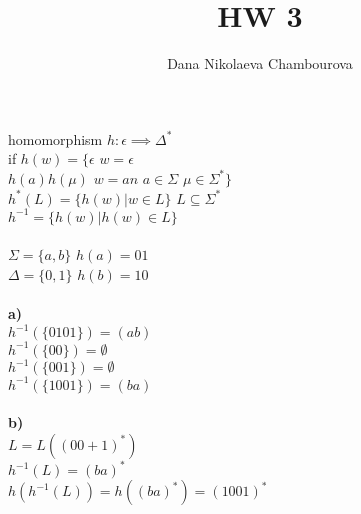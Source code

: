 \documentclass[12pt]{article}
\newenvironment{problem}[2][Problem]{\begin{trivlist}
\item[\hskip \labelsep {\bfseries #1}\hskip \labelsep {\bfseries #2.}]}{\end{trivlist}}
\begin{document}
\title{HW 3}
\author{Dana Nikolaeva Chambourova}
\maketitle
 
\begin{problem}{1}
homomorphism $h:\epsilon \implies \Delta^*$\\
if $h(w) = \{ \epsilon$  $ w = \epsilon $\\
$ h(a)h(\mu) $  $w=an$  $a \in \Sigma $ \text{ , } $\mu \in \Sigma^* \}$\\
$h^*(L) = \{ h(w) | w \in L \}$  $L \subseteq \Sigma^*$\\
$h^{-1} = \{ h(w) | h(w) \in L \}$ \\ \\ 
$\Sigma =  \{ a,b \}$\text{,  } $h(a) = 01$\\ 
$\Delta = \{0,1\}$\text{,  } $h(b) = 10$\\ \\
\textbf{a)}\\
$h^{-1}( \{0101\} )= (ab)$\\
$h^{-1}( \{00\} )= \emptyset$\\
$h^{-1}( \{001\} )= \emptyset$\\
$h^{-1}( \{1001\} )= (ba)$ \\ \\
\textbf{b)}\\
$L = L((00 + 1)^*)$\\
$h^{-1}(L) = (ba)^*$\\
$h(h^{-1}(L))=h((ba)^*) = (1001)^*$
\end{problem}
\end{document}
